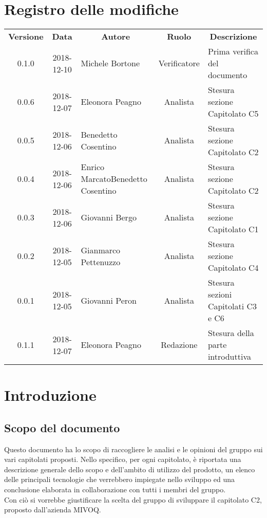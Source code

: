 \documentclass[11pt,a4paper]{article}
\begin{document}
	
	
	\newpage
	\section*{\centering Registro delle modifiche}
	\begin{tabularx}{\textwidth}{ c | c | X | c | X }
		\rowcolor{LightBlue}
		\color{white}\bfseries Versione & \color{white}\bfseries Data & \multicolumn{1}{c}{\color{white}\bfseries Autore} & \color{white}\bfseries Ruolo & \multicolumn{1}{c}{\color{white}\bfseries Descrizione}\\[0.25cm]
		
		0.1.0 & 2018-12-10 & Michele Bortone & Verificatore & Prima verifica del documento\\
		0.0.6 & 2018-12-07 & Eleonora Peagno & Analista & Stesura sezione Capitolato C5\\
		0.0.5 & 2018-12-06 & Benedetto Cosentino & Analista & Stesura sezione Capitolato C2\\
		0.0.4 & 2018-12-06 & Enrico Marcato\newline Benedetto Cosentino & Analista & Stesura sezione Capitolato C2\\
		0.0.3 & 2018-12-06 & Giovanni Bergo & Analista & Stesura sezione Capitolato C1\\
		0.0.2 & 2018-12-05 & Gianmarco Pettenuzzo & Analista & Stesura sezione Capitolato C4\\
		0.0.1 & 2018-12-05 & Giovanni Peron & Analista & Stesura sezioni Capitolati C3 e C6\\
		
		
		0.1.1 & 2018-12-07 & Eleonora Peagno & Redazione & Stesura della parte introduttiva\\
		
	\end{tabularx}
	\newpage
	\tableofcontents
	\newpage
	\section{Introduzione}
	\subsection{Scopo del documento}
	Questo documento ha lo scopo di raccogliere le analisi e le opinioni del gruppo sui vari capitolati proposti. Nello specifico, per ogni capitolato, è riportata una descrizione generale dello scopo e dell'ambito di utilizzo del prodotto, un elenco delle principali tecnologie che verrebbero impiegate nello sviluppo ed una conclusione elaborata in collaborazione con tutti i membri del gruppo.\\
Con ciò si vorrebbe giustificare la scelta del gruppo di sviluppare il capitolato C2, proposto dall'azienda MIVOQ.
\end{document}
